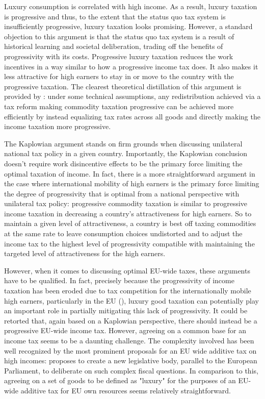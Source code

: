 \documentclass{article}
\begin{document}
Luxury consumption is correlated with high income. As a result, luxury taxation is progressive and thus, to the extent that the status quo tax system is insufficiently progressive, luxury taxation looks promising. However, a standard objection to this argument is that the status quo tax system is a result of historical learning and societal deliberation, trading off the benefits of progressivity with its costs. Progressive luxury taxation reduces the work incentives in a way similar to how a progressive income tax does. It also makes it less attractive for high earners to stay in or move to the country with the progressive taxation. The clearest theoretical distillation of this argument is provided by \citet{kaplow2006undesirability}: %
under some technical assumptions, any redistribution achieved via a tax reform making commodity taxation progressive can be achieved more efficiently by instead equalizing tax rates across all goods and directly making the income taxation more progressive. 

The Kaplowian argument stands on firm grounds when discussing unilateral national tax policy in a given country. Importantly, the Kaplowian conclusion doesn't require work disincentive effects to be the primary force limiting the optimal taxation of income. In fact, there is a more straightforward argument in the case where international mobility of high earners is the primary force limiting the degree of progressivity that is optimal from a national perspective with unilateral tax policy: progressive commodity taxation is similar to progressive income taxation in decreasing a country's attractiveness for high earners. So to maintain a given level of attractiveness, a country is best off taxing commodities at the same rate to leave consumption choices undistorted and to adjust the income tax to the highest level of progressivity compatible with maintaining the targeted level of attractiveness for the high earners.

However, when it comes to discussing optimal EU-wide taxes, these arguments have to be qualified. In fact, precisely because the progressivity of income taxation has been eroded due to tax competition for the internationally mobile high earners, particularly in the EU (\citet{kleven2011taxation}), luxury good taxation can potentially play an important role in partially mitigating this lack of progressivity. It could be retorted that, again based on a Kaplowian perspective, there should instead be a progressive EU-wide income tax. However, agreeing on a common base for an income tax seems to be a daunting challenge. The complexity involved has been well recognized by the most prominent proposals for an EU wide additive tax on high incomes: \citet{hennette2019democratize} proposes to create a new legislative body, parallel to the European Parliament, to deliberate on such complex fiscal questions. In comparison to this, agreeing on a set of goods to be defined as "luxury" for the purposes of an EU-wide additive tax for EU own resources seems relatively straightforward. 
\end{document}
